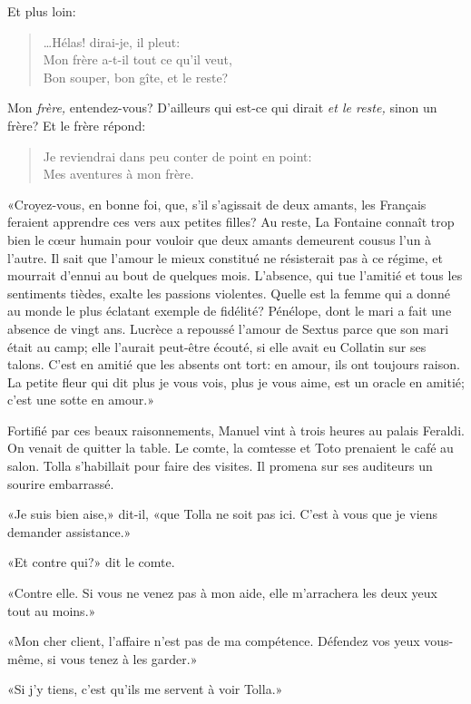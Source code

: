 Et plus loin:

\begin{quote}
…Hélas! dirai-je, il pleut:\\
Mon frère a-t-il tout ce qu’il veut,\\
Bon souper, bon gîte, et le reste?
\end{quote}

Mon \emph{frère,} entendez-vous? D'ailleurs qui est-ce qui dirait
\emph{et le reste,} sinon un frère? Et le frère répond:

\begin{quote}
Je reviendrai dans peu conter de point en point:\\
Mes aventures à mon frère.
\end{quote}

«Croyez-vous, en bonne foi, que, s'il s'agissait de deux amants, les
Français feraient apprendre ces vers aux petites filles? Au reste, La
Fontaine connaît trop bien le cœur humain pour vouloir que deux amants
demeurent cousus l'un à l'autre. Il sait que l'amour le mieux constitué
ne résisterait pas à ce régime, et mourrait d'ennui au bout de quelques
mois. L'absence, qui tue l'amitié et tous les sentiments tièdes, exalte
les passions violentes. Quelle est la femme qui a donné au monde le plus
éclatant exemple de fidélité? Pénélope, dont le mari a fait une absence
de vingt ans. Lucrèce a repoussé l'amour de Sextus parce que son mari
était au camp; elle l'aurait peut-être écouté, si elle avait eu Collatin
sur ses talons. C'est en amitié que les absents ont tort: en amour, ils
ont toujours raison. La petite fleur qui dit plus je vous vois, plus je
vous aime, est un oracle en amitié; c'est une sotte en amour.»

Fortifié par ces beaux raisonnements, Manuel vint à trois heures au
palais Feraldi. On venait de quitter la table. Le comte, la comtesse et
Toto prenaient le café au salon. Tolla s'habillait pour faire des
visites. Il promena sur ses auditeurs un sourire embarrassé.

«Je suis bien aise,» dit-il, «que Tolla ne soit pas ici. C'est à vous
que je viens demander assistance.»

«Et contre qui?» dit le comte.

«Contre elle. Si vous ne venez pas à mon aide, elle m'arrachera les deux
yeux tout au moins.»

«Mon cher client, l'affaire n'est pas de ma compétence. Défendez vos
yeux vous-même, si vous tenez à les garder.»

«Si j'y tiens, c'est qu'ils me servent à voir Tolla.»

